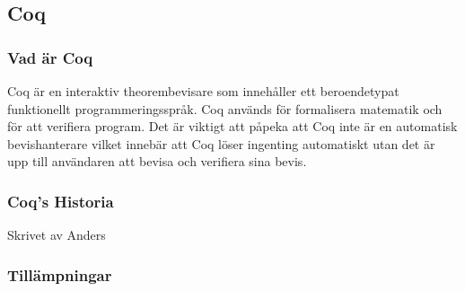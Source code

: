 \subsection{Coq}
\subsubsection{Vad är Coq}
Coq är en interaktiv theorembevisare som innehåller ett beroendetypat
funktionellt programmeringsspråk. Coq används för formalisera matematik och för
att verifiera program. Det är viktigt att påpeka att Coq inte är en automatisk
bevishanterare vilket innebär att Coq löser ingenting automatiskt utan det är
upp till användaren att bevisa och verifiera sina bevis.

\subsubsection{Coq's Historia}
Skrivet av Anders

\subsubsection{Tillämpningar}

